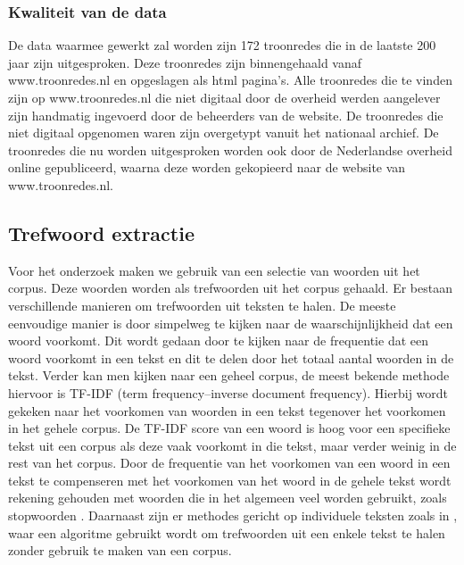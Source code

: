 \subsubsection{Kwaliteit van de data}
De data waarmee gewerkt zal worden zijn 172 troonredes die in de laatste 200 jaar zijn uitgesproken. Deze troonredes zijn binnengehaald vanaf www.troonredes.nl \citep{troonredes} en opgeslagen als html pagina's. Alle troonredes die te vinden zijn op www.troonredes.nl die niet digitaal door de overheid werden aangelever zijn handmatig ingevoerd door de beheerders van de website. De troonredes die niet digitaal opgenomen waren zijn overgetypt vanuit het nationaal archief. De troonredes die nu worden uitgesproken worden ook door de Nederlandse overheid online gepubliceerd, waarna deze worden gekopieerd naar de website van www.troonredes.nl.

\subsection{Trefwoord extractie}
Voor het onderzoek maken we gebruik van een selectie van woorden uit het corpus. Deze woorden worden als trefwoorden uit het corpus gehaald. Er bestaan verschillende manieren om trefwoorden uit teksten te halen. De meeste eenvoudige manier is door simpelweg te kijken naar de waarschijnlijkheid dat een woord voorkomt. Dit wordt gedaan door te kijken naar de frequentie dat een woord voorkomt in een tekst en dit te delen door het totaal aantal woorden in de tekst. Verder kan men kijken naar een geheel corpus, de meest bekende methode hiervoor is TF-IDF (term frequency–inverse document frequency)\citep{ramos2003using}. Hierbij wordt gekeken naar het voorkomen van woorden in een tekst tegenover het voorkomen in het gehele corpus. De TF-IDF score van een woord is hoog voor een specifieke tekst uit een corpus als deze vaak voorkomt in die tekst, maar verder weinig in de rest van het corpus. Door de frequentie van het voorkomen van een woord in een tekst te compenseren met het voorkomen van het woord in de gehele tekst wordt rekening gehouden met woorden die in het algemeen veel worden gebruikt, zoals stopwoorden \citep{aggarwal2012survey}. 
Daarnaast zijn er methodes gericht op individuele teksten zoals in \cite{matsuo2004keyword}, waar een algoritme gebruikt wordt om trefwoorden uit een enkele tekst te halen zonder gebruik te maken van een corpus.

